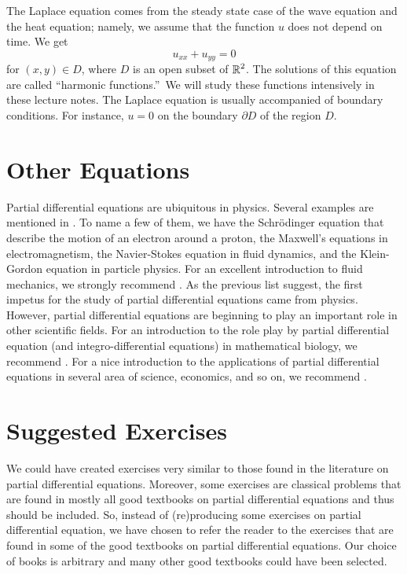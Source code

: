 The Laplace equation comes from the steady state case of the wave
equation and the heat equation; namely, we assume that the function
$u$ does not depend on time.  We get
\[
  u_{xx} + u_{yy} = 0
\]
for $(x,y) \in D$, where $D$ is an open subset of
$\displaystyle \mathbb{R}^2$.  The solutions of this
equation are called ``harmonic functions.''\  We will study these
functions intensively in these lecture notes.  The Laplace equation is
usually accompanied of boundary conditions.  For instance, $u=0$ on the
boundary $\partial D$ of the region $D$.

\section*{Other Equations}

Partial differential equations are ubiquitous in physics.  Several
examples are mentioned in \cite{Str}.  To name a few of them, we have
the Schrödinger equation that describe the motion of an electron
around a proton, the Maxwell's equations in electromagnetism, the
Navier-Stokes equation in fluid dynamics, and the Klein-Gordon
equation in particle physics.   For an excellent introduction to fluid
mechanics, we strongly recommend \cite{ChMa}.  As the previous list
suggest, the first impetus for the study of partial differential
equations came from physics.  However, partial differential equations are
beginning to play an important role in other scientific fields.  For an
introduction to the role play by partial differential equation (and
integro-differential equations) in mathematical biology, we recommend
\cite{Ho}.  For a nice introduction to the applications of partial
differential equations in several area of science, economics, and so
on, we recommend \cite{Sal}.

\section*{Suggested Exercises}

We could have created exercises very similar to those found in the
literature on partial differential equations.  Moreover, some
exercises are classical problems that are found in mostly all good textbooks on
partial differential equations and thus should be included.  So, instead of
(re)producing some exercises on partial differential equation, we have
chosen to refer the reader to the exercises that are found in some of
the good textbooks on partial differential equations.  Our choice of
books is arbitrary and many other good textbooks could have been selected.

